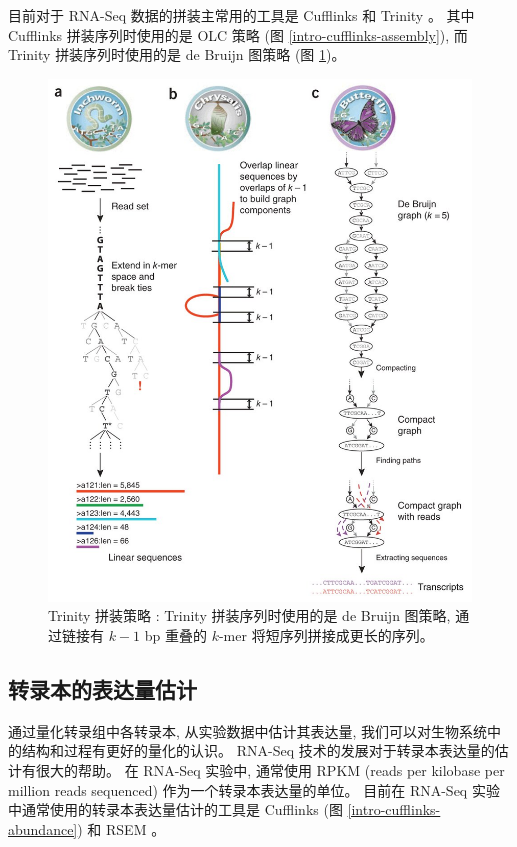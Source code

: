 目前对于 RNA-Seq 数据的拼装主常用的工具是 
Cufflinks \cite{cufflinks.2010} 和 Trinity \cite{grabherr2011full}。
其中 Cufflinks 拼装序列时使用的是 OLC 策略 (图 \ref{intro-cufflinks-assembly}), 
而 Trinity \cite{grabherr2011full} 拼装序列时使用的是 
de Bruijn 图策略 (图 \ref{intro-trinity-assembly})。

\begin{figure}[!t]
\centering
\includegraphics[width=\textwidth]{figures/trinity-assembly.jpg}
\caption[Trinity 拼装策略 \cite{grabherr2011full}]
{Trinity 拼装策略 \cite{grabherr2011full}: Trinity 拼装序列时使用的是 
de Bruijn 图策略, 通过链接有 $k-1$ bp 重叠的 $k$-mer 将短序列拼接成更长的序列。}
\label{intro-trinity-assembly}
\end{figure}

\subsection{转录本的表达量估计}
通过量化转录组中各转录本, 从实验数据中估计其表达量, 
我们可以对生物系统中的结构和过程有更好的量化的认识。 
RNA-Seq 技术的发展对于转录本表达量的估计有很大的帮助。 
在 RNA-Seq 实验中, 
通常使用 RPKM (reads per kilobase per million reads sequenced) 
\cite{mortazavi2008mapping} 作为一个转录本表达量的单位。 
目前在 RNA-Seq 实验中通常使用的转录本表达量估计的工具是 
Cufflinks \cite{cufflinks.2010} (图 \ref{intro-cufflinks-abundance})
和 RSEM \cite{li2011rsem}。

